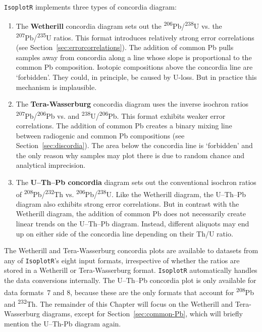 \begin{refsection}
\texttt{IsoplotR} implements three types of concordia diagram:

\begin{enumerate}
\item The \textbf{Wetherill} concordia diagram sets out the
  \textsuperscript{206}Pb/\textsuperscript{238}U vs. the
  \textsuperscript{207}Pb/\textsuperscript{235}U ratios. This format
  introduces relatively strong error correlations (see
  Section~\ref{sec:errorcorrelations}). The addition of common Pb
  pulls samples away from concordia along a line whose slope is
  proportional to the common Pb composition. Isotopic compositions
  above the concordia line are `forbidden'. They could, in principle,
  be caused by U-loss. But in practice this mechanism is implausible.
\item The \textbf{Tera-Wasserburg} concordia diagram uses the inverse
  isochron ratios \textsuperscript{207}Pb/\textsuperscript{206}Pb vs.
  and \textsuperscript{238}U/\textsuperscript{206}Pb. This format
  exhibits weaker error correlations. The addition of common Pb
  creates a binary mixing line between radiogenic and common Pb
  compositions (see Section~\ref{sec:discordia}). The area below the
  concordia line is `forbidden' and the only reason why samples may
  plot there is due to random chance and analytical imprecision.
\item The \textbf{U--Th--Pb concordia} diagram sets out the
  conventional isochron ratios of
  \textsuperscript{208}Pb/\textsuperscript{232}Th vs.
  \textsuperscript{206}Pb/\textsuperscript{238}U. Like the Wetherill
  diagram, the U--Th--Pb diagram also exhibits strong error
  correlations.  But in contrast with the Wetherill diagram, the
  addition of common Pb does not necessarily create linear trends on
  the U--Th--Pb diagram. Instead, different aliquots may end up on
  either side of the concordia line depending on their Th/U ratio.
\end{enumerate}

The Wetherill and Tera-Wasserburg concordia plots are available to
datasets from any of \texttt{IsoplotR}'s eight input formats,
irrespective of whether the ratios are stored in a Wetherill or
Tera-Wasserburg format. \texttt{IsoplotR} automatically handles the
data conversions internally. The U--Th--Pb concordia plot is only
available for data formats~7 and 8, because these are the only formats
that account for \textsuperscript{208}Pb and \textsuperscript{232}Th.
The remainder of this Chapter will focus on the Wetherill and
Tera-Wasserburg diagrams, except for Section~\ref{sec:common-Pb},
which will briefly mention the U--Th-Pb diagram again.\\


\end{refsection}
